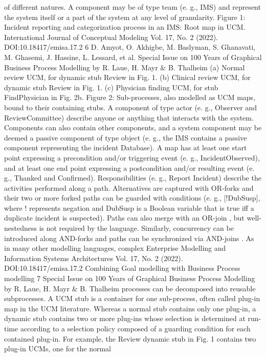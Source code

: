 of different natures. A component may be of type
team (e. g., IMS) and represent the system itself
or a part of the system at any level of granularity.
Figure 1: Incident reporting and categorization process in an IMS: Root map in UCM.
International Journal of Conceptual Modeling
Vol. 17, No. 2 (2022). DOI:10.18417/emisa.17.2
6 D. Amyot, O. Akhigbe, M. Baslyman, S. Ghanavati, M. Ghasemi, J. Hassine, L. Lessard, et al.
Special Issue on 100 Years of Graphical Business Process Modelling by R. Laue, H. Mayr & B. Thalheim
(a) Normal review UCM, for dynamic stub Review in Fig. 1.
(b) Clinical review UCM, for dynamic stub Review in Fig. 1.
(c) Physician finding UCM, for stub FindPhysician in Fig. 2b.
Figure 2: Sub-processes, also modelled as UCM maps, bound to their containing stubs.
A component of type actor (e. g., Observer and
ReviewCommittee) describe anyone or anything
that interacts with the system. Components can
also contain other components, and a system component may be deemed a passive component of
type object (e. g., the IMS contains a passive
component representing the incident Database).
A map has at least one start point expressing a precondition and/or triggering event (e. g.,
IncidentObserved), and at least one end point
expressing a postcondition and/or resulting event
(e. g., Thanked and Confirmed). Responsibilities
(e. g., Report Incident) describe the activities
performed along a path. Alternatives are captured
with OR-forks and their two or more forked
paths can be guarded with conditions (e. g., [!DubSusp], where ! represents negation and DubSusp
is a Boolean variable that is true iff a duplicate
incident is suspected). Paths can also merge with
an OR-join , but well-nestedness is not required
by the language. Similarly, concurrency can be
introduced along AND-forks and paths can be
synchronized via AND-joins .
As in many other modelling languages, complex
Enterprise Modelling and Information Systems Architectures
Vol. 17, No. 2 (2022). DOI:10.18417/emisa.17.2
Combining Goal modelling with Business Process modelling 7
Special Issue on 100 Years of Graphical Business Process Modelling by R. Laue, H. Mayr & B. Thalheim
processes can be decomposed into reusable subprocesses. A UCM stub is a container for one
sub-process, often called plug-in map in the UCM
literature. Whereas a normal stub contains only
one plug-in, a dynamic stub contains two or
more plug-ins whose selection is determined at
run-time according to a selection policy composed
of a guarding condition for each contained plug-in.
For example, the Review dynamic stub in Fig. 1
contains two plug-in UCMs, one for the normal
